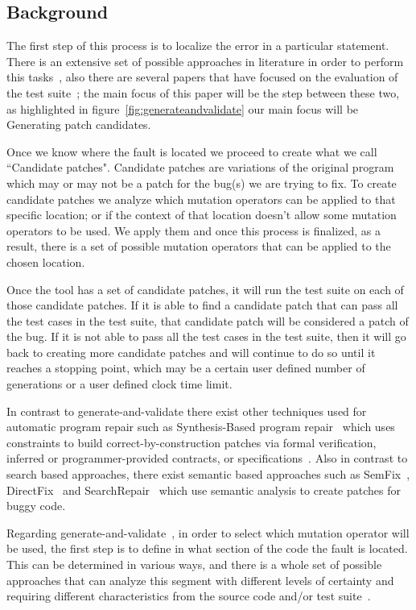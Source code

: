 \documentclass[conference]{IEEEtran}
\begin{document}
\subsection{Background}
The first step of this process is to localize the error in a particular 
statement. There is an extensive set of possible approaches in literature in 
order to perform this tasks~\cite{Jones05,Jones02,Chen02,legoues12,Qi13}, also there are several papers that have focused on the evaluation of the test suite~\cite{Qi13,fan15}; the main focus of this paper will be the step between these two, as highlighted in figure~\ref{fig:generateandvalidate} our main focus will be Generating patch candidates.

Once we know where the fault is located we proceed to create what we call 
``Candidate patches". Candidate patches are variations of the original program 
which may or may not be a patch for the bug(s) we are trying to fix. To 
create candidate patches we analyze which mutation operators can
be applied to that specific location; or if the context of that location doesn't
allow some mutation operators to be used. We apply them and once this process is finalized, as a result, there is a set of possible 
mutation operators that
can be applied to the chosen location.

Once the tool has a set of candidate patches, it will run the test suite on each 
of those candidate patches. If it is able to find a candidate patch that can 
pass all the test cases in the test suite, that candidate patch will be 
considered a patch of the bug. If it is not able to pass all the test cases in 
the test suite, then it will go back to creating more candidate patches and will 
continue to do so until it reaches a stopping point, which may be a certain user 
defined number of generations or a user defined clock time limit.

In contrast to generate-and-validate there exist other techniques used for 
automatic program repair such as Synthesis-Based program 
repair~\cite{jin11,pei14} which uses constraints to build 
correct-by-construction patches via formal verification, inferred or 
programmer-provided contracts,
or specifications~\cite{jin11,wei10}. Also in contrast to search based approaches, there exist semantic based approaches such as SemFix~\cite{nguyen13}, DirectFix~\cite{mechtaev15} and SearchRepair~\cite{ke15} which use semantic analysis to create patches for buggy code.

Regarding generate-and-validate~\cite{legoues12}, in
order to select which mutation operator will be used, the 
first step is to define in what section of the code the fault is located. This can be determined in various ways, and 
there is 
a whole set of
possible approaches that can analyze this segment with different levels of certainty and 
requiring different characteristics from the source code and/or test 
suite~\cite{Jones05,Jones02,Chen02,legoues12,Qi13,Qi2013,Abreu07,wong09}. 
\end{document}
